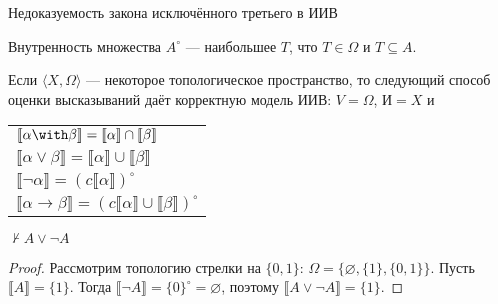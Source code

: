 \documentclass[aspectratio=169]{beamer}
\begin{document}
\begin{frame}{Недоказуемость закона исключённого третьего в ИИВ}
\begin{defrus}Внутренность множества $A^\circ$ --- наибольшее $T$, что $T \in \Omega$ и $T \subseteq A$.\end{defrus}
\begin{thmrus}Если $\langle X, \Omega\rangle$ --- некоторое топологическое пространство, то следующий способ оценки высказываний
даёт корректную модель ИИВ: $V = \Omega$, $\text{И} = X$ и 
\begin{tabular}{l}
$\llbracket \alpha \with \beta \rrbracket = \llbracket \alpha \rrbracket \cap \llbracket \beta \rrbracket$\\
$\llbracket \alpha \vee \beta \rrbracket = \llbracket \alpha \rrbracket \cup \llbracket \beta \rrbracket$\\
$\llbracket \neg\alpha \rrbracket = (c\llbracket \alpha \rrbracket)^\circ$\\
$\llbracket \alpha \rightarrow \beta \rrbracket = (c\llbracket \alpha \rrbracket \cup \llbracket \beta \rrbracket)^\circ$
\end{tabular}
\end{thmrus}

\begin{thmrus}$\not\vdash A\vee\neg A$\end{thmrus}
\begin{proof}Рассмотрим топологию стрелки на $\{0,1\}$: $\Omega = \{\varnothing, \{1\}, \{0,1\}\}$. Пусть $\llbracket A \rrbracket = \{1\}$. Тогда 
$\llbracket\neg A\rrbracket = \{0\}^\circ = \varnothing$, поэтому $\llbracket A \vee \neg A \rrbracket = \{1\}$.\end{proof}
\end{frame}
\end{document}
